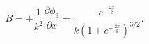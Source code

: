 \begin{equation} B=\pm \frac{1}{k^2}\frac{\partial \phi_3}{\partial
x}=\frac{e^{-\frac{2x}{k}}}{k(1+e^{-\frac{2x}{k}})^{3/2}}.
\end{equation}

